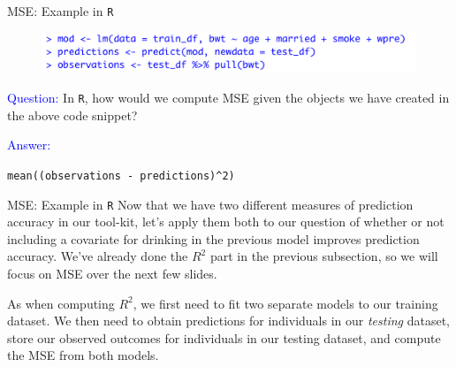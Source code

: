 \documentclass[10pt,t]{beamer}
\begin{document}
\begin{frame}{MSE: Example in \texttt{R}}

\begin{figure}
	\centering \includegraphics[scale=0.5]{figures/mse1.png}
\end{figure}
\vspace{0.3cm} 

\textcolor{blue}{Question:} In \texttt{R}, how would we compute MSE given the objects we have created in the above code snippet?

\vspace{0.3cm}

\textcolor{blue}{Answer:} 

\vspace{0.3cm}

\texttt{mean((observations - predictions)\^{}2)} 
\end{frame}

\begin{frame}{MSE: Example in \texttt{R}}
Now that we have two different measures of prediction accuracy in our tool-kit, let's apply them both to our question of whether or not including a covariate for drinking in the previous model improves prediction accuracy. We've already done the $R^2$ part in the previous subsection, so we will focus on MSE over the next few slides.

\vspace{0.3cm}
As when computing $R^2$, we first need to fit two separate models to our training dataset.
We then need to obtain predictions for individuals in our \textit{testing} dataset, store our observed outcomes for individuals in our testing dataset, and compute the MSE from both models.
\end{frame}
\end{document}

